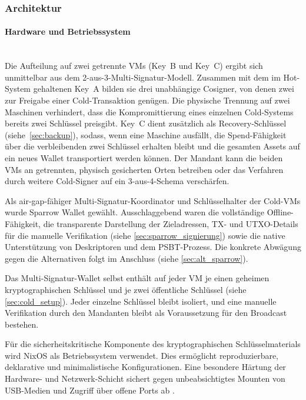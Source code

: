 \subsubsection{Architektur}

\paragraph{Hardware und Betriebssystem} \mbox{}\\
Die Aufteilung auf zwei getrennte \acp{VM} (Key~B und Key~C) ergibt sich unmittelbar aus dem 2-aus-3-Multi-Signatur-Modell. Zusammen mit dem im Hot-System gehaltenen Key~A bilden sie drei unabhängige Cosigner, von denen zwei zur Freigabe einer Cold-Transaktion genügen. 
Die physische Trennung auf zwei Maschinen verhindert, dass die Kompromittierung eines einzelnen Cold-Systems bereits zwei Schlüssel preisgibt. Key~C dient zusätzlich als Recovery-Schlüssel (siehe~\ref{sec:backup}), sodass, wenn eine Maschine ausfällt, die Spend-Fähigkeit über die verbleibenden zwei Schlüssel erhalten bleibt und die gesamten Assets auf ein neues Wallet transportiert werden können. Der Mandant kann die beiden \acp{VM} an getrennten, physisch gesicherten Orten betreiben oder das Verfahren durch weitere Cold-Signer auf ein 3-aus-4-Schema verschärfen.

Als air-gap-fähiger Multi-Signatur-Koordinator und Schlüsselhalter der Cold-\acp{VM} wurde Sparrow Wallet gewählt. Ausschlaggebend waren die vollständige Offline-Fähigkeit, die transparente Darstellung der Zieladressen, \ac{TX}- und \ac{UTXO}-Details für die manuelle Verifikation (siehe \ref{sec:sparrow_signierung}) sowie die native Unterstützung von Deskriptoren und dem \ac{PSBT}-Prozess. Die konkrete Abwägung gegen die Alternativen folgt im Anschluss (siehe \ref{sec:alt_sparrow}).

Das Multi-Signatur-Wallet selbst enthält auf jeder \ac{VM} je einen geheimen kryptographischen Schlüssel und je zwei öffentliche Schlüssel (siehe \ref{sec:cold_setup}). Jeder einzelne Schlüssel bleibt isoliert, und eine manuelle Verifikation durch den Mandanten bleibt als Voraussetzung für den Broadcast bestehen.

Für die sicherheitskritische Komponente des kryptographischen Schlüsselmaterials wird NixOS als Betriebssystem verwendet. Dies ermöglicht reproduzierbare, deklarative und minimalistische Konfigurationen. Eine besondere Härtung der Hardware- und Netzwerk-Schicht sichert gegen unbeabsichtigtes Mounten von \ac{USB}-Medien und Zugriff über offene Ports ab \cite{nixos_funktionsweise}.

